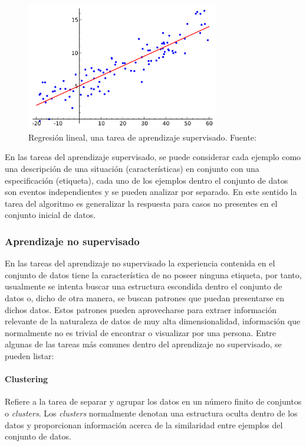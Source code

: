             \begin{figure}[!h] 
                \centering
                \includegraphics[width=0.75\textwidth]{img/regression}
                \caption{Regresión lineal, una tarea de aprendizaje supervisado. Fuente: \cite{wikipedia_2018} }
                \label{fig:regresion}
            \end{figure}

        En las tareas del aprendizaje supervisado, se puede considerar cada ejemplo como una descripción de 
        una situación (características) en conjunto con una especificación (etiqueta), cada uno de los ejemplos 
        dentro el conjunto de datos son eventos independientes y se pueden analizar por separado. En este sentido
        la tarea del algoritmo es generalizar la respuesta para casos no presentes en el conjunto inicial de datos.

        \subsubsection{Aprendizaje no supervisado}
        En las tareas del aprendizaje no supervisado la experiencia contenida en el conjunto de datos tiene la característica de 
        no poseer ninguna etiqueta, por tanto, usualmente se intenta buscar una estructura escondida dentro el conjunto de datos 
        o, dicho de otra manera, se buscan patrones que puedan presentarse en dichos datos. Estos patrones pueden aprovecharse 
        para extraer información relevante de la naturaleza de datos de muy alta dimensionalidad, información que normalmente no 
        es trivial de encontrar o visualizar por una persona. Entre algunas de las tareas más comunes dentro del aprendizaje no 
        supervisado, se pueden listar:

            \paragraph{Clustering}
            Refiere a la tarea de separar y agrupar los datos en un número finito de conjuntos o \textit{clusters}. Los 
            \textit{clusters} normalmente denotan una estructura oculta dentro de los datos y proporcionan información acerca 
            de la similaridad entre ejemplos del conjunto de datos.

